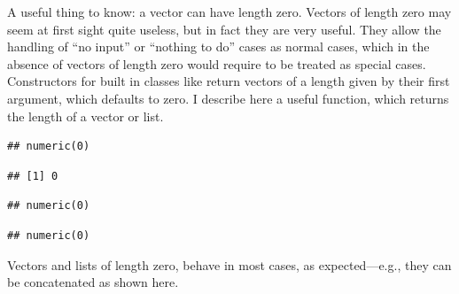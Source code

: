 \documentclass[krantz2]{krantz}\usepackage{knitr}
\begin{document}
\begin{explainbox}
A useful thing to know: a vector can have length zero. Vectors of length zero may seem at first sight quite useless, but in fact they are very useful. They allow the handling of ``no input'' or ``nothing to do'' cases as normal cases, which in the absence of vectors of length zero would require to be treated as special cases. Constructors for built in classes like  return vectors of a length given by their first argument, which defaults to zero. I describe here a useful function,  which returns the length of a vector or list.

\begin{knitrout}\footnotesize
{}\color{fgcolor}\begin{kframe}
\begin{alltt}
 \hlkwb{<-} \hlstd{(}\hlstd{)}
\end{alltt}
\begin{verbatim}
## numeric(0)
\end{verbatim}
\begin{alltt}
\end{alltt}
\begin{verbatim}
## [1] 0
\end{verbatim}
\end{kframe}
\end{knitrout}

\begin{knitrout}\footnotesize
{}\color{fgcolor}\begin{kframe}
\begin{alltt}
 \hlkwb{<-} \hlstd{()}
\end{alltt}
\begin{verbatim}
## numeric(0)
\end{verbatim}
\begin{alltt}
 \hlkwb{<-} \hlstd{(} \hlstd{=} \hlstd{)}
\end{alltt}
\begin{verbatim}
## numeric(0)
\end{verbatim}
\end{kframe}
\end{knitrout}

Vectors and lists of length zero, behave in most cases, as expected---e.g., they can be concatenated as shown here.


\end{explainbox}
\end{document}
